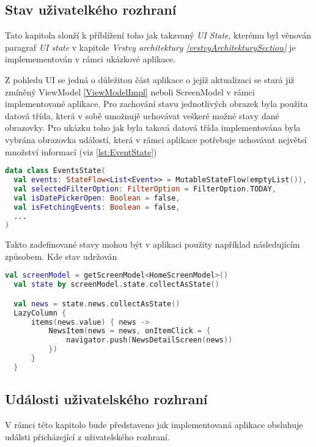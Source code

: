 \subsection{Stav uživatelkého rozhraní} \label{stateHandlingImpl}
Tato kapitola slouží k příblížení toho jak takzvaný \textit{UI State}, kterému byl věnován paragraf \textit{UI state} v 
kapitole \textit{Vrstvy architektury \ref{vrstvyArchitekturySection} } je implemementován v rámci ukázkové aplikace.

Z pohledu UI se jedná o důležitou část aplikace o jejíž aktualizaci se stará již zmíněný ViewModel \ref{ViewModelImpl} neboli ScreenModel v rámci
implementované aplikace. 
Pro zachování stavu jednotlivých obrazek byla použita datová třída, která v sobě umožnujě uchovávat veškeré možné stavy dané obrazovky.
Pro ukázku toho jak byla taková datová třída implementována byla vybrána obrazovka událostí, která v rámci aplikace potřebuje 
uchovávat největsí množství informací (viz \ref{lst:EventState})

\begin{lstlisting}[caption={Event State katalog}, label={lst:EventState}, language=Kotlin]
data class EventsState(
  val events: StateFlow<List<Event>> = MutableStateFlow(emptyList()),
  val selectedFilterOption: FilterOption = FilterOption.TODAY,
  val isDatePickerOpen: Boolean = false,
  val isFetchingEvents: Boolean = false,
  ...
)
\end{lstlisting}

Takto zadefinované stavy mohou být v aplikaci použity například následujícím způsobem. Kde stav udržován 

\begin{lstlisting}[caption={Použití stavu v aplikaci}, label={lst:StateImpl}, language=Kotlin]
  val screenModel = getScreenModel<HomeScreenModel>()
  val state by screenModel.state.collectAsState()

  val news = state.news.collectAsState()
  LazyColumn {
      items(news.value) { news ->
          NewsItem(news = news, onItemClick = {
              navigator.push(NewsDetailScreen(news))
          })
      }
  }
\end{lstlisting}

\subsection{Události uživatelského rozhraní} \label{eventHandlingImpl}
V rámci této kapitolo bude představeno jak implementovaná aplikace obsluhuje událsti přicházející z uživatelského rozhraní.


